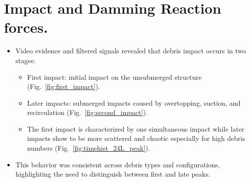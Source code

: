 \documentclass{article}
\begin{document}
\section{Impact and Damming Reaction forces.}
\begin{itemize}
    \item Video evidence and filtered signals revealed that debris impact occurs in two stages:
    \begin{itemize}
        \item First impact: initial impact on the unsubmerged structure (Fig.~\ref{fig:first_impact}). 
        \item Later impacts: submerged impacts caused by overtopping, suction, and recirculation (Fig.~\ref{fig:second_impact}).
        \item  The first impact is characterized by one simultaneous impact while later impacts show to be more scattered and chaotic especially for high debris numbers (Fig.~\ref{fig:timehist_24L_peak}).
    \end{itemize}
    \item This behavior was consistent across debris types and configurations, highlighting the need to distinguish between first and late peaks.
\end{itemize}
\end{document}
